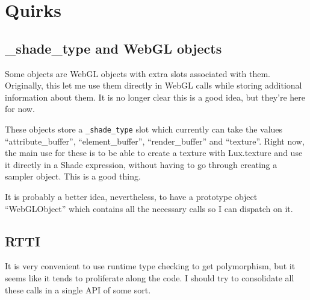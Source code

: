 \chapter{Quirks}

\section{\_shade\_type and WebGL objects}

Some \lux objects are WebGL objects with extra slots associated with
them. Originally, this let me use them directly in WebGL calls while
storing additional information about them. It is no longer clear this
is a good idea, but they're here for now.

These objects store a \texttt{\_shade\_type} slot which currently can
take the values ``attribute\_buffer'', ``element\_buffer'', ``render\_buffer'' and
``texture''. Right now, the main use for these is to be able to create
a texture with Lux.texture and use it directly in a Shade
expression, without having to go through creating a sampler
object. This is a good thing.

It is probably a better idea, nevertheless, to have a prototype object
``WebGLObject'' which contains all the necessary calls so I can
dispatch on it.

\section{RTTI}

It is very convenient to use runtime type checking to get
polymorphism, but it seems like it tends to proliferate along the
code. I should try to consolidate all these calls in a single API of
some sort.
